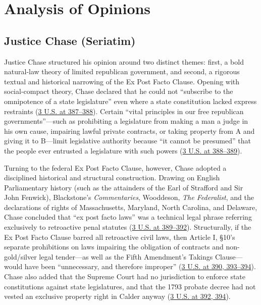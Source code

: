 \documentclass[12pt]{article}
\begin{document}
\section{Analysis of Opinions}

\subsection{Justice Chase (Seriatim)}

Justice Chase structured his opinion around two distinct themes: first, a bold natural-law theory of limited republican government, and second, a rigorous textual and historical narrowing of the Ex Post Facto Clause. Opening with social-compact theory, Chase declared that he could not ``subscribe to the omnipotence of a state legislature'' even where a state constitution lacked express restraints (\href{https://supreme.justia.com/cases/federal/us/3/386/}{3 U.S. at 387--388}). Certain ``vital principles in our free republican governments''---such as prohibiting a legislature from making a man a judge in his own cause, impairing lawful private contracts, or taking property from A and giving it to B---limit legislative authority because ``it cannot be presumed'' that the people ever entrusted a legislature with such powers (\href{https://supreme.justia.com/cases/federal/us/3/386/}{3 U.S. at 388--389}).

Turning to the federal Ex Post Facto Clause, however, Chase adopted a disciplined historical and structural construction. Drawing on English Parliamentary history (such as the attainders of the Earl of Strafford and Sir John Fenwick), Blackstone's \textit{Commentaries}, Wooddeson, \textit{The Federalist}, and the declarations of rights of Massachusetts, Maryland, North Carolina, and Delaware, Chase concluded that ``ex post facto laws'' was a technical legal phrase referring exclusively to retroactive penal statutes (\href{https://supreme.justia.com/cases/federal/us/3/386/}{3 U.S. at 389--392}). Structurally, if the Ex Post Facto Clause barred all retroactive civil laws, then Article I, \S 10's separate prohibitions on laws impairing the obligation of contracts and non-gold/silver legal tender---as well as the Fifth Amendment's Takings Clause---would have been ``unnecessary, and therefore improper'' (\href{https://supreme.justia.com/cases/federal/us/3/386/}{3 U.S. at 390, 393--394}). Chase also added that the Supreme Court had no jurisdiction to enforce state constitutions against state legislatures, and that the 1793 probate decree had not vested an exclusive property right in Calder anyway (\href{https://supreme.justia.com/cases/federal/us/3/386/}{3 U.S. at 392, 394}).
\end{document}
